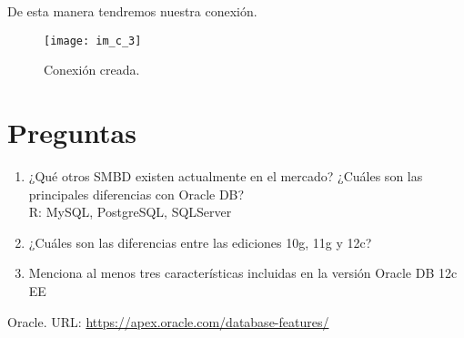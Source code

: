 \documentclass[10pt]{article}
\begin{document}
	De esta manera tendremos nuestra conexión.
	\begin{figure}[H]
		\centering
	\texttt{[image: im\_c\_3]}
	\caption{Conexión creada.}
    \end{figure}
	
	\section{Preguntas}
	\begin{enumerate}
		\item ¿Qué otros SMBD existen actualmente en el mercado? ¿Cuáles son las principales diferencias con Oracle DB?\\
		R: MySQL, PostgreSQL, SQLServer
        \item ¿Cuáles son las diferencias entre las ediciones 10g, 11g y 12c?\\
        \item Menciona al menos tres características incluidas en la versión Oracle DB 12c EE\\
	
	\end{enumerate}

\begin{thebibliography}{}
	\bibitem{}Oracle. URL: \url{https://apex.oracle.com/database-features/}
\end{thebibliography}

 
\end{document}
